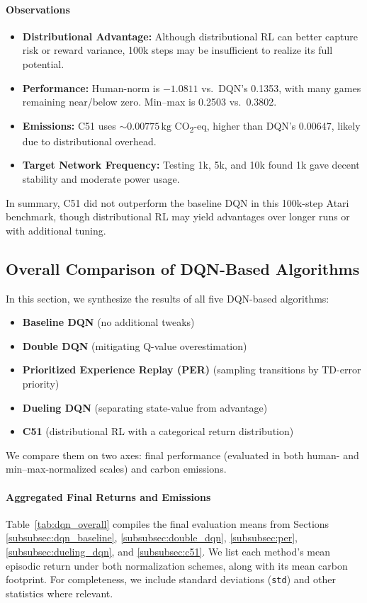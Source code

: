 \paragraph{Observations}
\begin{itemize}
	\item \textbf{Distributional Advantage:} 
	Although distributional RL can better capture risk or reward variance, 
	100k steps may be insufficient to realize its full potential.
	\item \textbf{Performance:} 
	Human-norm is $-1.0811$ vs.\ DQN’s 0.1353, with many games remaining near/below zero. 
	Min--max is 0.2503 vs.\ 0.3802.
	\item \textbf{Emissions:}
	C51 uses $\sim0.00775\,\mathrm{kg}$ CO\textsubscript{2}-eq, higher than DQN’s 0.00647, 
	likely due to distributional overhead.
	\item \textbf{Target Network Frequency:}
	Testing 1k, 5k, and 10k found 1k gave decent stability and moderate power usage.
\end{itemize}

In summary, C51 did not outperform the baseline DQN in this 100k-step Atari benchmark, 
though distributional RL may yield advantages over longer runs or with additional tuning.


\subsection{Overall Comparison of DQN-Based Algorithms}
\label{subsec:dqn_overall_comparison}

In this section, we synthesize the results of all five DQN-based algorithms:
\begin{itemize}
	\item \textbf{Baseline DQN} (no additional tweaks)
	\item \textbf{Double DQN} (mitigating Q-value overestimation)
	\item \textbf{Prioritized Experience Replay (PER)} (sampling transitions by TD-error priority)
	\item \textbf{Dueling DQN} (separating state-value from advantage)
	\item \textbf{C51} (distributional RL with a categorical return distribution)
\end{itemize}
We compare them on two axes: final performance (evaluated in both human- and min--max-normalized scales) and carbon emissions. 

\paragraph{Aggregated Final Returns and Emissions}
Table~\ref{tab:dqn_overall} compiles the final evaluation means from Sections \ref{subsubsec:dqn_baseline}, \ref{subsubsec:double_dqn}, \ref{subsubsec:per}, \ref{subsubsec:dueling_dqn}, and \ref{subsubsec:c51}. We list each method’s mean episodic return under both normalization schemes, along with its mean carbon footprint. For completeness, we include standard deviations (\texttt{std}) and other statistics where relevant.

